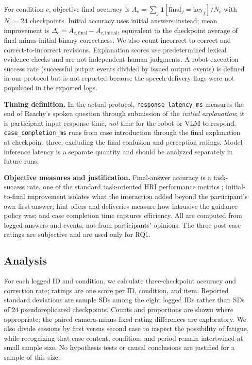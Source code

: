 \documentclass[conference]{IEEEtran}
\begin{document}
For condition $c$, objective final accuracy is $A_c=\sum_j \mathbf1[\mathrm{final}_j=\mathrm{key}_j]/N_c$ with $N_c=24$ checkpoints. Initial accuracy uses initial answers instead; mean improvement is $\Delta_c=A_{c,\mathrm{final}}-A_{c,\mathrm{initial}}$, equivalent to the checkpoint average of final minus initial binary correctness. We also count incorrect-to-correct and correct-to-incorrect revisions. Explanation scores use predetermined lexical evidence checks and are not independent human judgments. A robot-execution success rate (successful output events divided by issued output events) is defined in our protocol but is not reported because the speech-delivery flags were not populated in the exported logs.

\noindent\textbf{Timing definition.} In the actual protocol, \texttt{response\_latency\_ms} measures the end of Reachy's spoken question through submission of the \emph{initial explanation}; it is participant input-response time, \emph{not} time for the robot or VLM to respond. \texttt{case\_completion\_ms} runs from case introduction through the final explanation at checkpoint three, excluding the final confusion and perception ratings. Model inference latency is a separate quantity and should be analyzed separately in future runs.

\noindent\textbf{Objective measures and justification.} Final-answer accuracy is a task-success rate, one of the standard task-oriented HRI performance metrics \cite{steinfeld2006common}; initial-to-final improvement isolates what the interaction added beyond the participant's own first answer; hint offers and deliveries measure how intrusive the guidance policy was; and case completion time captures efficiency. All are computed from logged answers and events, not from participants' opinions. The three post-case ratings are subjective and are used only for RQ1.

\subsection{Analysis}
For each logged ID and condition, we calculate three-checkpoint accuracy and correction rate; ratings are one score per ID, condition, and item. Reported standard deviations are sample SDs among the eight logged IDs rather than SDs of 24 pseudoreplicated checkpoints. Counts and proportions are shown where appropriate; the paired camera-minus-fixed rating differences are exploratory. We also divide sessions by first versus second case to inspect the possibility of fatigue, while recognizing that case content, condition, and period remain intertwined at small sample size. No hypothesis tests or causal conclusions are justified for a sample of this size.
\end{document}
